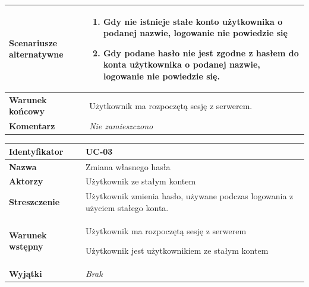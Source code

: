 {\begin{tabular}{ | l | l | }
	\hline
		\parbox[t]{4cm}{\textbf{Scenariusze alternatywne}} & \parbox[t]
		{11cm}{
			\begin{enumerate}
				\item Gdy nie istnieje stałe konto użytkownika o podanej
				nazwie, logowanie nie powiedzie się
				\item Gdy podane hasło nie jest zgodne z hasłem do
				konta użytkownika o podanej nazwie, logowanie nie powiedzie
				się.
			\end{enumerate}
		}
		\\
		
	\hline
		\parbox[t]{4cm}{\textbf{Warunek końcowy}} & \parbox[t]{11cm}{
			Użytkownik ma rozpoczętą sesję z serwerem.
		}
		\\
		
	\hline
		\parbox[t]{4cm}{\textbf{Komentarz}} & \parbox[t]{11cm}{
			\textit{Nie zamieszczono}
		}
		\\

	\hline
\end{tabular}

\vspace{2em}

\begin{tabular}{ | l | l | }
	\hline
		\textbf{Identyfikator} & 
		UC-03
		\\
		
	\hline
		\textbf{Nazwa} & 
		Zmiana własnego hasła
		\\
		
	\hline
		\textbf{Aktorzy} & \parbox[t]{11cm}{
			Użytkownik ze stałym kontem
		}\\
		 
	\hline
		\parbox[t]{4cm}{\textbf{Streszczenie}} & \parbox[t]{11cm}{
			Użytkownik zmienia hasło, używane podczas logowania z użyciem
			stałego konta.
			
		}\\
		
	\hline
		\parbox[t]{4cm}{\textbf{Warunek wstępny}} & \parbox[t]{11cm}{
			\begin{enumreq}
				\item Użytkownik ma rozpoczętą sesję z serwerem
				\item Użytkownik jest użytkownikiem ze stałym kontem
			\end{enumreq}
		}
		\\
		
	\hline
		\parbox[t]{4cm}{\textbf{Wyjątki}} & \parbox[t]{11cm}{
			\textit{Brak}
			
		}
		\\


\end{tabular}}
